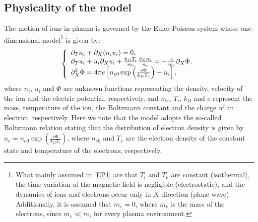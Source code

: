 \documentclass{amsart}
\numberwithin{equation}{section}
\theoremstyle{plain}%
\theoremstyle{definition}
\theoremstyle{remark}
\theoremstyle{remark}
\begin{document}

\subsection{Physicality of the model}
The motion of ions in plasma is governed by the  Euler-Poisson system
whose one-dimensional model\footnote{What mainly assumed in \eqref{EP1} are that $T_i$ and $T_e$ are constant (isothermal), the time variation of the magnetic field is negligible (electrostatic), and the dynamics of ions and electrons occur only in $X$ direction (plane wave). Additionally, it is assumed that $m_e=0$, where $m_e$ is the mass of the electrons, since $m_e \ll  m_i$ for every plasma environment.}
is given by:
\begin{equation}\label{EP1}
\left\{
\begin{array}{l l}
\partial_T n_i + \partial_X(n_iu_i) = 0, \\ 
\partial_T u_i  + u_i\partial_X u_i + \frac{k_BT_i}{m_i}\frac{\partial_X n_i}{n_i} = -\frac{e}{m_i}\partial_X\Phi, \\
\partial_X^2 \Phi = 4\pi e \left[ n_{e0}\exp\left(\frac{e\Phi}{k_BT_e}\right) - n_i \right],
\end{array} 
\right.
\end{equation}
where $n_i$, $u_i$ and $\Phi$ are unknown functions representing the density, velocity of the ion and the electric potential, respectively, and $m_i$, $T_i$, $k_B$ and $e$ represent the mass, temperature of the ion, the Boltzmann constant and the charge of an electron, respectively. Here we note that the model adopts the so-called Boltzmann relation stating that the distribution of electron density  is given by $n_e = n_{e0}\exp\left(\frac{e\Phi}{k_BT_e}\right)$, where $n_{e0}$ and $T_e$ are the electron density of the constant state and temperature of the electrons,  respectively. 
\end{document}
